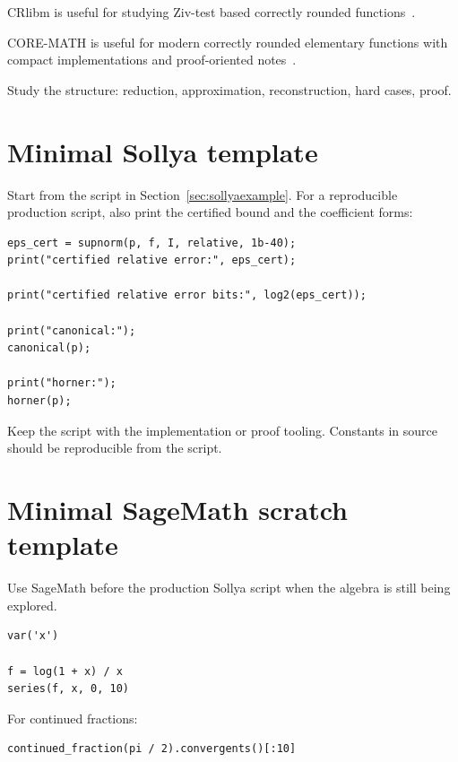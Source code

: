 \documentclass[manuscript, nonacm]{acmart}
\begin{document}
  CRlibm is useful for studying Ziv-test based correctly rounded
  functions~\cite{crlibm,coremath}.

  CORE-MATH is useful for modern correctly rounded elementary functions with
  compact implementations and proof-oriented notes~\cite{coremath}.

  Study the structure: reduction, approximation, reconstruction, hard cases,
  proof.



  \section{Minimal Sollya template}

  Start from the script in Section~\ref{sec:sollyaexample}. For a
  reproducible production script,
  also print the certified bound and the coefficient forms:

  \begin{lstlisting}[style=sollya]
eps_cert = supnorm(p, f, I, relative, 1b-40);
print("certified relative error:", eps_cert);

print("certified relative error bits:", log2(eps_cert));

print("canonical:");
canonical(p);

print("horner:");
horner(p);
  \end{lstlisting}

  Keep the script with the implementation or proof tooling. Constants in
  source should be reproducible from the script.



  \section{Minimal SageMath scratch template}

  Use SageMath before the production Sollya script when the algebra is still
  being explored.

  \begin{lstlisting}[style=shell]
var('x')

f = log(1 + x) / x
series(f, x, 0, 10)
  \end{lstlisting}

  For continued fractions:
  \begin{lstlisting}[style=shell]
continued_fraction(pi / 2).convergents()[:10]
  \end{lstlisting}
\end{document}
